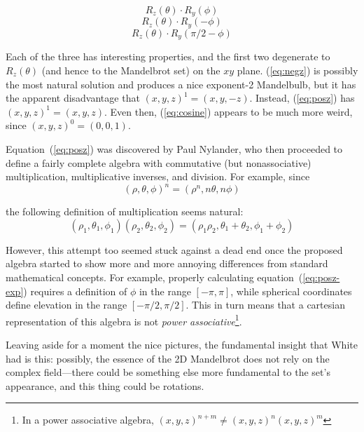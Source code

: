 \documentclass{article}
\begin{document}
\begin{equation}
\label{eq:negz}
  R_z(\theta) \cdot R_y(\phi)
\end{equation}
\begin{equation}
\label{eq:posz}
  R_z(\theta) \cdot R_y(-\phi)
\end{equation}
\begin{equation}
\label{eq:cosine}
  R_z(\theta) \cdot R_y(\pi/2-\phi)
\end{equation}

Each of the three has interesting properties, and the first two
degenerate to $R_z(\theta)$ (and hence to the Mandelbrot set) on the
$xy$ plane.  (\ref{eq:negz}) is possibly the most natural solution and
produces a nice exponent-2 Mandelbulb, but it has the apparent
disadvantage that $(x,y,z)^1=(x,y,-z)$.  Instead, (\ref{eq:posz}) has
$(x,y,z)^1=(x,y,z)$.  Even then, (\ref{eq:cosine}) appears to be
much more weird, since $(x,y,z)^0=(0,0,1)$.

Equation~(\ref{eq:posz}) was discovered by Paul Nylander, who then proceeded to
define a fairly complete algebra with commutative (but nonassociative)
multiplication, multiplicative inverses, and division.  For example,
since
\begin{equation}
  \label{eq:posz-exp}
  (\rho,\theta,\phi)^n=(\rho^n, n\theta, n\phi)
\end{equation}

\noindent
the following definition of multiplication seems natural:
\begin{equation*}
  (\rho_1,\theta_1,\phi_1) (\rho_2,\theta_2,\phi_2)=
  (\rho_1 \rho_2,\theta_1+\theta_2,\phi_1+\phi_2)
\end{equation*}

\noindent
However, this attempt too seemed stuck against a dead end once the
proposed algebra started to show more and more annoying differences
from standard mathematical concepts.  For example, properly
calculating equation~(\ref{eq:posz-exp}) requires a definition of
$\phi$ in the range $[-\pi,\pi]$, while spherical coordinates define
elevation in the range $[-\pi/2,\pi/2]$.  This in turn means that a
cartesian representation of this algebra is not \emph{power
  associative}\footnote{In a power associative algebra, $(x,y,z)^{n+m}
  \ne (x,y,z)^n (x,y,z)^m$}.

Leaving aside for a moment the nice pictures, the fundamental insight
that White had is this: possibly, the essence of the 2D Mandelbrot does
not rely on the complex field---there could be something else more
fundamental to the set's appearance, and this thing could be rotations.
\end{document}
